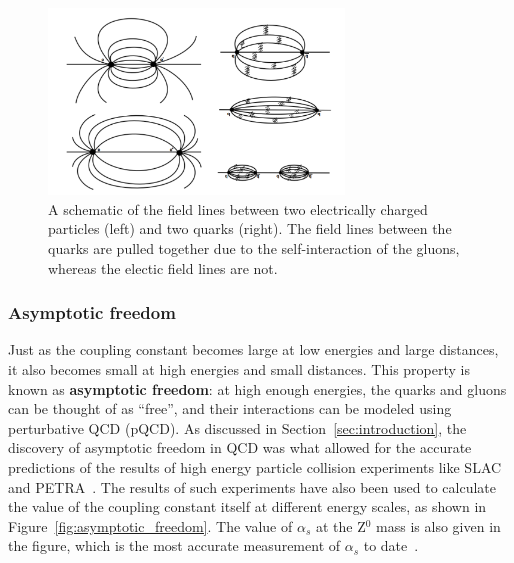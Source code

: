 \begin{figure}[ht]
    \centering
    \includegraphics[width=0.7\textwidth]{figures/introduction/electric_color_fields.png}
    \caption{A schematic of the field lines between two electrically charged particles (left) and two quarks (right). The field lines between the quarks are pulled together due to the self-interaction of the gluons, whereas the electic field lines are not.}
    \label{fig:field_line_differences}
\end{figure}

\subsubsection{Asymptotic freedom}
\label{sec:qcd_asymptotic_freedom}

Just as the coupling constant becomes large at low energies and large distances, it also becomes small at high energies and small distances. This property is known as \textbf{asymptotic freedom}: at high enough energies, the quarks and gluons can be thought of as ``free'', and their interactions can be modeled using perturbative QCD (pQCD). As discussed in Section~\ref{sec:introduction}, the discovery of asymptotic freedom in QCD was what allowed for the accurate predictions of the results of high energy particle collision experiments like SLAC~\cite{SLAC} and PETRA~\cite{PETRA}. The results of such experiments have also been used to calculate the value of the coupling constant itself at different energy scales, as shown in Figure~\ref{fig:asymptotic_freedom}. The value of $\alpha_s$ at the Z$^0$ mass is also given in the figure, which is the most accurate measurement of $\alpha_s$ to date~\cite{PDG}. 

